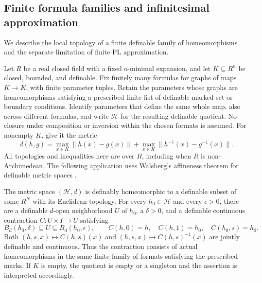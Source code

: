 \subsection{Finite formula families and infinitesimal approximation}
We describe the local topology of a finite definable family of
homeomorphisms and the separate limitation of finite PL approximation.

Let $R$ be a real closed field with a fixed o-minimal expansion,
and let $K\subseteq R^n$ be closed, bounded, and definable.
Fix finitely many formulas for graphs of maps $K\to K$, with
finite parameter tuples.  Retain the parameters whose graphs are
homeomorphisms satisfying a prescribed finite list of definable
marked-set or boundary conditions.  Identify parameters that define
the same whole map, also across different formulas, and write
$\mathcal H$ for the resulting definable quotient.  No closure under
composition or inversion within the chosen formats is assumed.
For nonempty $K$, give it the metric
\begin{equation}\label{eq:finite-format-uniform-metric}
 d(h,g)=\max_{x\in K}\|h(x)-g(x)\|
          +\max_{x\in K}\|h^{-1}(x)-g^{-1}(x)\|.
\end{equation}
All topologies and inequalities here are over $R$, including when
$R$ is non-Archimedean.  The following application uses Walsberg's
affineness theorem for definable metric spaces
\cite[Theorem~7.1, p.~16]{Walsberg2015}.

\begin{theorem}\label{thm:finite-format-homeomorphism-contractions}
The metric space $(\mathcal H,d)$ is definably homeomorphic to a
definable subset of some $R^N$ with its Euclidean topology.
For every $h_0\in\mathcal H$ and every $\epsilon>0$, there are a
definable $d$-open neighborhood $U$ of $h_0$, a $\delta>0$, and a
definable continuous contraction $C:U\times I\to U$ satisfying
\[
 B_d(h_0,\delta)\subseteq U\subseteq B_d(h_0,\epsilon),\qquad
 C(h,0)=h,\quad C(h,1)=h_0,\quad C(h_0,s)=h_0.
\]
Both $(h,s,x)\mapsto C(h,s)(x)$ and
$(h,s,x)\mapsto C(h,s)^{-1}(x)$ are jointly definable and continuous.
Thus the contraction consists of actual homeomorphisms in the same
finite family of formats satisfying the prescribed marks.  If $K$
is empty, the quotient is empty or a singleton and the assertion is
interpreted accordingly.
\end{theorem}

